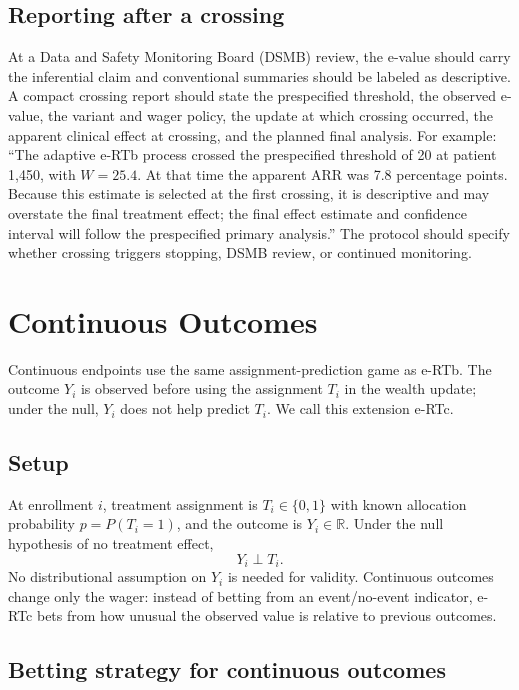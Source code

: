 \documentclass[10pt]{article}
\begin{document}
\subsection{Reporting after a crossing}

At a Data and Safety Monitoring Board (DSMB) review, the e-value should carry the inferential claim and conventional summaries should be labeled as descriptive. A compact crossing report should state the prespecified threshold, the observed e-value, the variant and wager policy, the update at which crossing occurred, the apparent clinical effect at crossing, and the planned final analysis. For example: ``The adaptive e-RTb process crossed the prespecified threshold of 20 at patient 1{,}450, with $W=25.4$. At that time the apparent ARR was 7.8 percentage points. Because this estimate is selected at the first crossing, it is descriptive and may overstate the final treatment effect; the final effect estimate and confidence interval will follow the prespecified primary analysis.'' The protocol should specify whether crossing triggers stopping, DSMB review, or continued monitoring.

\section{Continuous Outcomes}

Continuous endpoints use the same assignment-prediction game as e-RTb. The outcome $Y_i$ is observed before using the assignment $T_i$ in the wealth update; under the null, $Y_i$ does not help predict $T_i$. We call this extension e-RTc.

\subsection{Setup}

At enrollment $i$, treatment assignment is $T_i \in \{0,1\}$ with known allocation probability $p=P(T_i=1)$, and the outcome is $Y_i \in \mathbb{R}$. Under the null hypothesis of no treatment effect,
\begin{equation}
Y_i \perp T_i.
\end{equation}
No distributional assumption on $Y_i$ is needed for validity. Continuous outcomes change only the wager: instead of betting from an event/no-event indicator, e-RTc bets from how unusual the observed value is relative to previous outcomes.

\subsection{Betting strategy for continuous outcomes}
\end{document}
